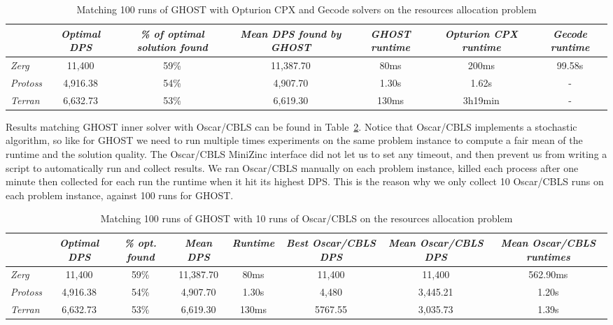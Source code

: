 \documentclass[journal]{IEEEtran}
\newcommand{\ghost}{\textsc{GHOST}\xspace}
\begin{document}
\begin{table}[ht]
  \caption{Matching 100  runs of \ghost  with Opturion CPX  and Gecode
    solvers on the resources allocation problem} 
    \label{tab:SOTA}
    \centering
    \begin{tabular}{|l|c|c|c|c|c|c|}
      \cline{2-7}
      \multicolumn{1}{c|}{} &  {\em Optimal  DPS}& {\em \%  of optimal
        solution found} 
      & {\em Mean DPS found by \ghost}& {\em \ghost runtime}
      & {\em Opturion CPX runtime}& {\em Gecode runtime} \\
      \hline
      {\em Zerg} & 11,400 & 59\% & 11,387.70 & 80ms & 200ms & 99.58s\\
      {\em Protoss} & 4,916.38 & 54\% & 4,907.70 & 1.30s & 1.62s & - \\ 
      {\em Terran} & 6,632.73 & 53\% & 6,619.30 & 130ms & 3h19min & - \\ 
      \hline
    \end{tabular}  
\end{table}

Results matching \ghost  inner solver with Oscar/CBLS can  be found in
Table~\ref{tab:oscar}. Notice that  Oscar/CBLS implements a stochastic
algorithm,  so  like  for  \ghost   we  need  to  run  multiple  times
experiments on the same problem instance to compute a fair mean of the
runtime and  the solution quality.  The  Oscar/CBLS MiniZinc interface
did not let us to set any  timeout, and then prevent us from writing a
script to  automatically run  and collect  results. We  ran Oscar/CBLS
manually  on each  problem  instance, killed  each  process after  one
minute then collected for each run the runtime when it hit its highest
DPS. This is the reason why we only collect 10 Oscar/CBLS runs on each
problem instance, against 100 runs for \ghost.

\begin{table}[ht]
  \caption{Matching 100 runs of \ghost with 10 runs of Oscar/CBLS on the resources allocation problem} 
    \label{tab:oscar}
    \centering
    \begin{tabular}{|l|c|c|c|c|c|c|c|}
      \cline{2-8}
      \multicolumn{1}{c|}{} & {\em Optimal DPS}& {\em \% opt. found} 
      & {\em Mean DPS}& {\em Runtime}
      & {\em Best Oscar/CBLS DPS}& {\em Mean Oscar/CBLS DPS}
      & {\em Mean Oscar/CBLS runtimes} \\
      \hline
      {\em Zerg} & 11,400 & 59\% & 11,387.70 & 80ms & 11,400 & 11,400 &
      562.90ms\\
      {\em Protoss}  & 4,916.38  & 54\%  & 4,907.70 &  1.30s &  4,480 &
      3,445.21 & 1.20s\\ 
      {\em Terran}  & 6,632.73 & 53\%  & 6,619.30 & 130ms  & 5767.55 &
      3,035.73 & 1.39s \\ 
      \hline
    \end{tabular}  
\end{table}
\end{document}
